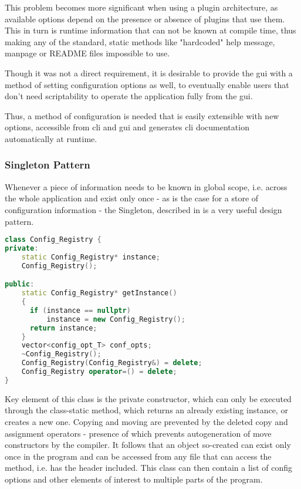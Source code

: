 This problem becomes more significant when using a plugin architecture, as available options depend on the presence or absence of plugins that use them. This in turn is runtime information that can not be known at compile time, thus making any of the standard, static methods like "hardcoded" help message, manpage or README files impossible to use.

Though it was not a direct requirement, it is desirable to provide the \gls{gui} with a method of setting configuration options as well, to eventually enable users that don't need scriptability to operate the application fully from the \gls{gui}.

Thus, a method of configuration is needed that is easily extensible with new options, accessible from \gls{cli} and \gls{gui} and generates \gls{cli} documentation automatically at runtime.

\subsubsection{Singleton Pattern}
\label{sec:ston}
Whenever a piece of information needs to be known in global scope, i.e. across the whole application and exist only once - as is the case for a store of configuration information - the Singleton, described in \citet[pp. 127ff]{Gamma1994} is a very useful design pattern. 

\begin{lstlisting}[caption=Singleton Implementation in C++, language=c++]
class Config_Registry {
private:
    static Config_Registry* instance; 
    Config_Registry();

public:
    static Config_Registry* getInstance()
    {
      if (instance == nullptr)
          instance = new Config_Registry();
      return instance;
    }
    vector<config_opt_T> conf_opts;
    ~Config_Registry();
    Config_Registry(Config_Registry&) = delete;
    Config_Registry operator=() = delete;
}

\end{lstlisting}
Key element of this class is the private constructor, which can only be executed through the class-static  method, which returns an already existing instance, or creates a new one.
Copying and moving are prevented by the deleted copy and assignment operators - presence of which prevents autogeneration of move constructors by the compiler.
It follows that an object so-created can exist only once in the program and can be accessed from any file that can access the  method, i.e. has the header included. 
This class can then contain a list of config options and other elements of interest to multiple parts of the program. 

